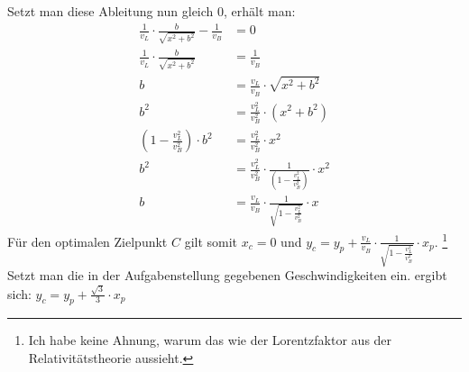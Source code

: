 \documentclass[a4paper, notitlepage, 12pt]{scrartcl}
\begin{document}
 Setzt man diese Ableitung nun gleich $0$, erhält man:
 \begin{align}
 \frac{1}{v_L} \cdot \frac{b}{\sqrt{x^2 + b^2}} - \frac{1}{v_B} &= 0 \\
 \frac{1}{v_L} \cdot \frac{b}{\sqrt{x^2 + b^2}} &= \frac{1}{v_B} \\
 b &= \frac{v_L}{v_B} \cdot \sqrt{x^2 + b^2} \\
 b^2 &= \frac{v_L^2}{v_B^2} \cdot (x^2 + b^2) \\
 (1 - \frac{v_L^2}{v_B^2}) \cdot b^2 &= \frac{v_L^2}{v_B^2} \cdot x^2 \\
 b^2 &= \frac{v_L^2}{v_B^2} \cdot \frac{1}{(1 - \frac{v_L^2}{v_B^2})} \cdot x^2 \\
 b &= \frac{v_L}{v_B} \cdot \frac{1}{\sqrt{1 - \frac{v_L^2}{v_B^2}}} \cdot x
 \end{align}
 Für den optimalen Zielpunkt $C$ gilt somit $x_c = 0$ und $y_c = y_p + \frac{v_L}{v_B} \cdot \frac{1}{\sqrt{1 - \frac{v_L^2}{v_B^2}}} \cdot x_p$. \footnote{Ich habe keine Ahnung, warum das wie der Lorentzfaktor aus der Relativitätstheorie aussieht.} Setzt man die in der Aufgabenstellung gegebenen Geschwindigkeiten ein. ergibt sich: $y_c = y_p + \frac{\sqrt{3}}{3} \cdot x_p$
\end{document}
